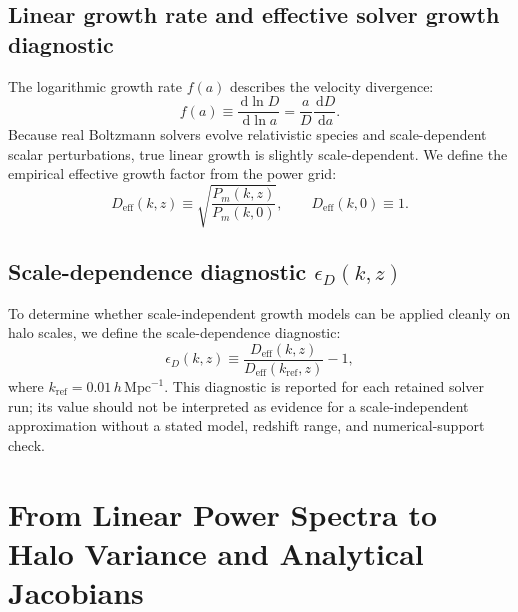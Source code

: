 \documentclass[11pt]{article}
\newcommand{\dd}{\,\mathrm d}
\newcommand{\Mpc}{\mathrm{Mpc}}
\begin{document}
\subsection{Linear growth rate and effective solver growth diagnostic}
The logarithmic growth rate $f(a)$ describes the velocity divergence:
\begin{equation}
\boxed{f(a) \equiv \frac{\dd\ln D}{\dd\ln a} = \frac{a}{D}\frac{\dd D}{\dd a}}.
\end{equation}
Because real Boltzmann solvers evolve relativistic species and scale-dependent scalar perturbations, true linear growth is slightly scale-dependent. We define the empirical effective growth factor from the power grid:
\begin{equation}
\boxed{D_{\mathrm{eff}}(k, z) \equiv \sqrt{\frac{P_m(k, z)}{P_m(k, 0)}}}, \qquad D_{\mathrm{eff}}(k, 0) \equiv 1.
\end{equation}

\subsection{Scale-dependence diagnostic \texorpdfstring{$\epsilon_D(k,z)$}{epsilonD(k,z)}}
To determine whether scale-independent growth models can be applied cleanly on halo scales, we define the scale-dependence diagnostic:
\begin{equation}
\boxed{\epsilon_D(k, z) \equiv \frac{D_{\mathrm{eff}}(k, z)}{D_{\mathrm{eff}}(k_{\mathrm{ref}}, z)} - 1},
\end{equation}
where $k_{\mathrm{ref}} = 0.01\,h\,\Mpc^{-1}$. This diagnostic is reported for each retained solver run; its value should not be interpreted as evidence for a scale-independent approximation without a stated model, redshift range, and numerical-support check.

\section{From Linear Power Spectra to Halo Variance and Analytical Jacobians}
\label{sec:variance}
\end{document}
